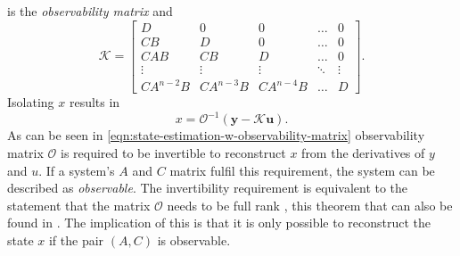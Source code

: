 is the \textit{observability matrix} and
\[ \mathcal{K}=
\begin{bmatrix}
    D & 0 & 0 & \hdots & 0\\
    CB & D & 0 & \hdots & 0\\
    CAB & CB & D & \hdots & 0 \\
    \vdots & \vdots & \vdots & \ddots & \vdots \\
    CA^{n-2}B & CA^{n-3}B & CA^{n-4}B & \hdots & D
\end{bmatrix}.
\]
Isolating $x$ results in
\begin{equation}\label{eqn:state-estimation-w-observability-matrix}
    x = \mathcal{O}^{-1}(\mathbf{y}-\mathcal{K}\mathbf{u}).
\end{equation}
As can be seen in \eqref{eqn:state-estimation-w-observability-matrix} observability matrix $\mathcal{O}$ is required to be invertible to reconstruct $x$ from the derivatives of $y$ and $u$. If a system's $A$ and $C$ matrix fulfil this requirement, the system can be described as \textit{observable}. The invertibility requirement is equivalent to the statement that the matrix $\mathcal{O}$ needs to be full rank \cite[Section 2.9]{Lay2016LinearApplications}, this theorem that can also be found in \cite[Corollary 3.8]{Antsaklis2006LinearSystems}. The implication of this is that it is only possible to reconstruct the state $x$ if the pair $(A,C)$ is observable. 

